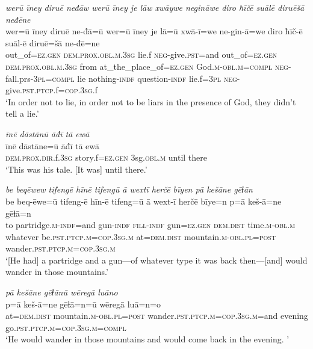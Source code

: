 \ea \label{BP.211}
\textit{werū īney diruē neđāw werū īney je lāw xwāywe negināwe diro ħīčē suālē diruēšā neđēne} \\ 
\gll wer=ū īney diruē ne-đā=ū wer=ū īney je lā=ū xwā-ī=we ne-gin-ā=we diro ħīč-ē suāl-ē diruē=šā ne-đē=ne \\ 
 out\_of\textsc{=ez.gen} \textsc{dem.prox}\textsc{.obl}\textsc{.m}\textsc{.3sg} lie.f \textsc{neg-}give\textsc{.pst}=and out\_of\textsc{=ez.gen} \textsc{dem.prox}\textsc{.obl}\textsc{.m}\textsc{.3sg} from at\_the\_place\_of\textsc{=ez.gen} God\textsc{.m}\textsc{-obl}\textsc{.m}\textsc{=compl} \textsc{neg-}fall.prs\textsc{-3pl}\textsc{=compl} lie nothing\textsc{-indf} question\textsc{-indf} lie.f\textsc{=3pl} \textsc{neg-}give\textsc{.pst}\textsc{.ptcp}.f\textsc{=cop}\textsc{.3sg}.f \\ 
\glt `In order not to lie, in order not to be liars in the presence of God, they didn’t tell a lie.'
\z 
 
\ea \label{BP.212}
\textit{īnē dāstānū āđī tā ewā} \\ 
\gll īnē dāstāne=ū āđī tā ewā \\ 
 \textsc{dem.prox}\textsc{.dir}.f\textsc{.3sg} story.f\textsc{=ez.gen} 3sg\textsc{.obl}\textsc{.m} until there \\ 
\glt `This was his tale. [It was] until there.'
\z 
 

\ea \label{ŠJ.7}
\textit{be beqēwew tifengē hīnē tifengū ā wextī herčē bīyen pā kešāne gēɫān} \\ 
\gll be beq-ēwe=ū tifeng-ē hīn-ē tifeng=ū ā wext-ī herčē bīye=n p=ā keš-ā=ne gēɫā=n \\ 
 to partridge\textsc{.m}\textsc{-indf}=and gun\textsc{-indf} \textsc{fill}\textsc{-indf} gun\textsc{=ez.gen} \textsc{dem.dist} time\textsc{.m}\textsc{-obl}\textsc{.m} whatever be\textsc{.pst}\textsc{.ptcp}\textsc{.m}\textsc{=cop}\textsc{.3sg}\textsc{.m} at=\textsc{dem.dist} mountain\textsc{.m}\textsc{-obl}\textsc{.pl}\textsc{=\textsc{post}} wander\textsc{.pst}\textsc{.ptcp}\textsc{.m}\textsc{=cop}\textsc{.3sg}\textsc{.m} \\ 
\glt `[He had] a partridge and a gun—of whatever type it was back then—[and] would wander in those mountains.'
\z 
 
\ea \label{ŠJ.8}
\textit{pā kešāne gēɫānū wēregā luāno} \\ 
\gll p=ā keš-ā=ne gēɫā=n=ū wēregā luā=n=o \\ 
 at=\textsc{dem.dist} mountain\textsc{.m}\textsc{-obl}\textsc{.pl}\textsc{=\textsc{post}} wander\textsc{.pst}\textsc{.ptcp}\textsc{.m}\textsc{=cop}\textsc{.3sg}\textsc{.m}=and evening go\textsc{.pst}\textsc{.ptcp}\textsc{.m}\textsc{=cop}\textsc{.3sg}\textsc{.m}\textsc{=compl} \\ 
\glt `He would wander in those mountains and would come back in the evening. '
\z 
 
